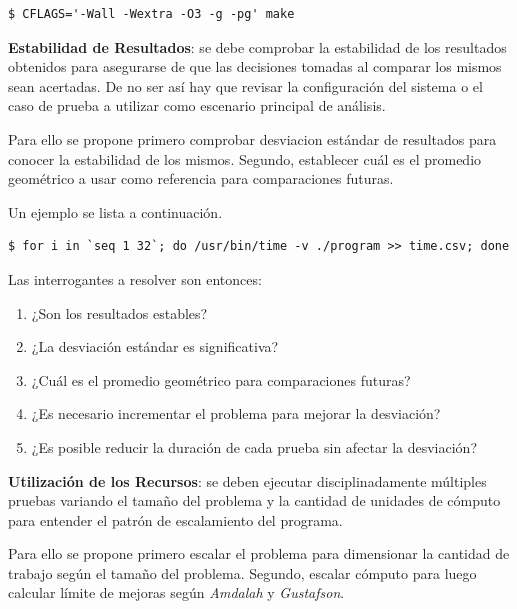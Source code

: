 \documentclass[a4paper]{report}
\begin{document}
\begin{lstlisting}[caption={Compilación del Binario},label={lst:compilation}]
$ CFLAGS='-Wall -Wextra -O3 -g -pg' make
\end{lstlisting}

\bigskip

{\bf Estabilidad de Resultados}: se debe comprobar la estabilidad de los resultados obtenidos para asegurarse de que las decisiones tomadas al comparar los mismos sean acertadas. De no ser así hay que revisar la configuración del sistema o el caso de prueba a utilizar como escenario principal de análisis.

\bigskip

Para ello se propone primero comprobar desviacion estándar de resultados para conocer la estabilidad de los mismos. Segundo, establecer cuál es el promedio geométrico a usar como referencia para comparaciones futuras.

\bigskip

Un ejemplo se lista a continuación.

\begin{lstlisting}[caption={Estabilidad de Resultados},label={lst:time}]
$ for i in `seq 1 32`; do /usr/bin/time -v ./program >> time.csv; done
\end{lstlisting}

Las interrogantes a resolver son entonces:

\begin{enumerate}
\item ¿Son los resultados estables?
\item ¿La desviación estándar es significativa?
\item ¿Cuál es el promedio geométrico para comparaciones futuras?
\item ¿Es necesario incrementar el problema para mejorar la desviación?
\item ¿Es posible reducir la duración de cada prueba sin afectar la desviación?
\end{enumerate}

{\bf Utilización de los Recursos}: se deben ejecutar disciplinadamente múltiples pruebas variando el tamaño del problema y la cantidad de unidades de cómputo para entender el patrón de escalamiento del programa.

\bigskip

Para ello se propone primero escalar el problema para dimensionar la cantidad de trabajo según el tamaño del problema. Segundo, escalar cómputo para luego calcular límite de mejoras según {\it Amdalah} y {\it Gustafson}.
\end{document}

